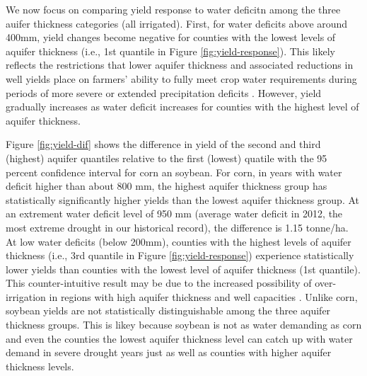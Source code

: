 \documentclass[
]{article}
\begin{document}
We now focus on comparing yield response to water deficitn among the three auifer thickness categories (all irrigated). First, for water deficits above around 400mm, yield changes become negative for counties with the lowest levels of aquifer thickness (i.e., 1st quantile in Figure \ref{fig:yield-response}). This likely reflects the restrictions that lower aquifer thickness and associated reductions in well yields place on farmers' ability to fully meet crop water requirements during periods of more severe or extended precipitation deficits \citetext{\citealp[\citet{foster2014modeling}]{rad2020effects}; \citealp{hrozencik2017heterogeneous}}. However, yield gradually increases as water deficit increases for counties with the highest level of aquifer thickness.

Figure \ref{fig:yield-dif} shows the difference in yield of the second and third (highest) aquifer quantiles relative to the first (lowest) quatile with the 95 percent confidence interval for corn an soybean. For corn, in years with water deficit higher than about 800 mm, the highest aquifer thickness group has statistically significantly higher yields than the lowest aquifer thickness group. At an extrement water deficit level of 950 mm (average water deficit in 2012, the most extreme drought in our historical record), the difference is 1.15 tonne/ha. At low water deficits (below 200mm), counties with the highest levels of aquifer thickness (i.e., 3rd quantile in Figure \ref{fig:yield-response}) experience statistically lower yields than counties with the lowest level of aquifer thickness (1st quantile). This counter-intuitive result may be due to the increased possibility of over-irrigation in regions with high aquifer thickness and well capacities \citep{foster2019assessing, gibson2017case, gibson2019benchmarking}. Unlike corn, soybean yields are not statistically distinguishable among the three aquifer thickness groups. This is likey because soybean is not as water demanding as corn and even the counties the lowest aquifer thickness level can catch up with water demand in severe drought years just as well as counties with higher aquifer thickness levels.
\end{document}
